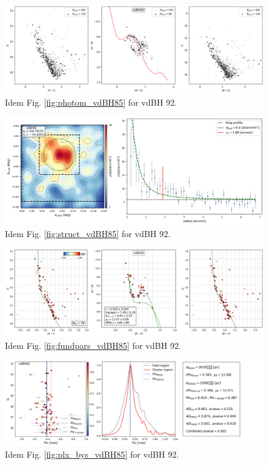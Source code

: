 \documentclass[draft]{aa}
\begin{document}
\begin{figure}[ht]
    \centering
    \includegraphics[width=\hsize]{../figs/obs_vdBH92.png}
    \caption{Idem Fig. \ref{fig:photom_vdBH85} for vdBH 92.}
    \label{fig35}
\end{figure}
\begin{figure}[ht]
    \centering
    \includegraphics[width=\hsize]{../figs/dmap_vdbh92.png}
    \caption{Idem Fig. \ref{fig:struct_vdBH85} for vdBH 92.}
    \label{fig36}
\end{figure}
\begin{figure}[ht]
    \centering
    \includegraphics[width=\hsize]{../figs/cmds_vdbh92.png}
    \caption{Idem Fig. \ref{fig:fundpars_vdBH85} for vdBH 92.}
    \label{fig37}
\end{figure}
\begin{figure}[ht]
    \centering
    \includegraphics[width=\hsize]{../figs/plx_vdBH92.png}
    \caption{Idem Fig. \ref{fig:plx_bys_vdBH85} for vdBH 92.}
    \label{fig38}
\end{figure}
\end{document}
